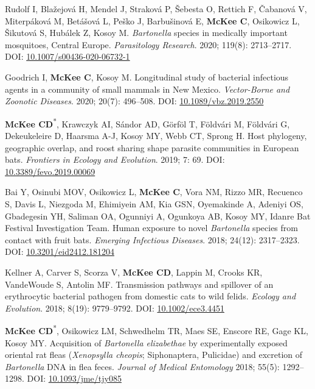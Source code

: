 \documentclass{cv}
\begin{document}
\begin{pubenum}
\item Rudolf I, Blažejová H, Mendel J, Straková P, Šebesta O, Rettich F, Čabanová V, Miterpáková M, Betášová L, Peško J, Barbušinová E, \textbf{McKee C}, Osikowicz L, Šikutová S, Hubálek Z, Kosoy M. \textit{Bartonella} species in medically important mosquitoes, Central Europe. \textit{Parasitology Research}. 2020; 119(8): 2713--2717. DOI: \href{https://doi.org/10.1007/s00436-020-06732-1}{10.1007/s00436-020-06732-1}

\item Goodrich I, \textbf{McKee C}, Kosoy M. Longitudinal study of bacterial infectious agents in a community of small mammals in New Mexico. \textit{Vector-Borne and Zoonotic Diseases}. 2020; 20(7): 496--508. DOI: \href{https://doi.org/10.1089/vbz.2019.2550}{10.1089/vbz.2019.2550}

\item \textbf{McKee CD}\textsuperscript{*}, Krawczyk AI, Sándor AD, Görföl T, Földvári M, Földvári G, Dekeukeleire D, Haarsma A-J, Kosoy MY, Webb CT, Sprong H. Host phylogeny, geographic overlap, and roost sharing shape parasite communities in European bats. \textit{Frontiers in Ecology and Evolution}. 2019; 7: 69. DOI: \href{https://doi.org/10.3389/fevo.2019.00069}{10.3389/fevo.2019.00069}

\item Bai Y, Osinubi MOV, Osikowicz L, \textbf{McKee C}, Vora NM, Rizzo MR, Recuenco S, Davis L, Niezgoda M, Ehimiyein AM, Kia GSN, Oyemakinde A, Adeniyi OS, Gbadegesin YH, Saliman OA, Ogunniyi A, Ogunkoya AB, Kosoy MY, Idanre Bat Festival Investigation Team. Human exposure to novel \textit{Bartonella} species from contact with fruit bats. \textit{Emerging Infectious Diseases}. 2018; 24(12): 2317--2323. DOI: \href{https://doi.org/10.3201/eid2412.181204}{10.3201/eid2412.181204}

\item Kellner A, Carver S, Scorza V, \textbf{McKee CD}, Lappin M, Crooks KR, VandeWoude S, Antolin MF. Transmission pathways and spillover of an erythrocytic bacterial pathogen from domestic cats to wild felids. \textit{Ecology and Evolution}. 2018; 8(19): 9779--9792. DOI: \href{https://doi.org/10.1002/ece3.4451}{10.1002/ece3.4451}

\item \textbf{McKee CD}\textsuperscript{*}, Osikowicz LM, Schwedhelm TR, Maes SE, Enscore RE, Gage KL, Kosoy MY. Acquisition of \textit{Bartonella elizabethae} by experimentally exposed oriental rat fleas (\textit{Xenopsylla cheopis}; Siphonaptera, Pulicidae) and excretion of \textit{Bartonella} DNA in flea feces. \textit{Journal of Medical Entomology} 2018; 55(5): 1292--1298. DOI: \href{https://doi.org/10.1093/jme/tjy085}{10.1093/jme/tjy085}


\end{pubenum}
\end{document}
